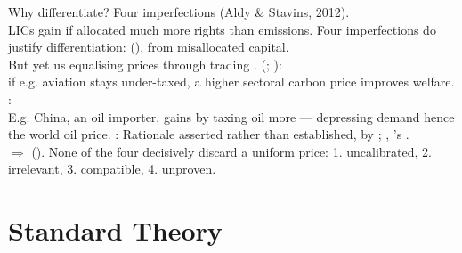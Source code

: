 \documentclass[aspectratio=169,xcolor=dvipsnames, 11pt,mathserif]{beamer}
\begin{document}
\begin{frame}{Why differentiate? Four imperfections\label{literature}}
\small
\bbvsp
\ip {} (Aldy \& Stavins, 2012). %
\\ LICs gain if allocated much more rights than emissions. 
\ip Four imperfections do justify differentiation:
  \bbvsp
  \ip {} (), from misallocated capital. \pause \\ But  yet  us  equalising prices through trading .
  \ip {} (; ): \\if e.g. aviation stays under-taxed, a higher sectoral carbon price improves welfare. %
  \ip {}: \\E.g. China, an oil importer, gains by taxing oil more --- depressing demand hence the world oil price. %
  \ip {}: Rationale asserted rather than established, by ; , 's . \\ \pause
  $\Rightarrow$  ().
  \ee
\ip None of the four decisively discard a uniform price:  1. uncalibrated, 2. irrelevant, 3. compatible, 4. unproven. 
\ee
\end{frame}


\section{Standard Theory}
\end{document}
